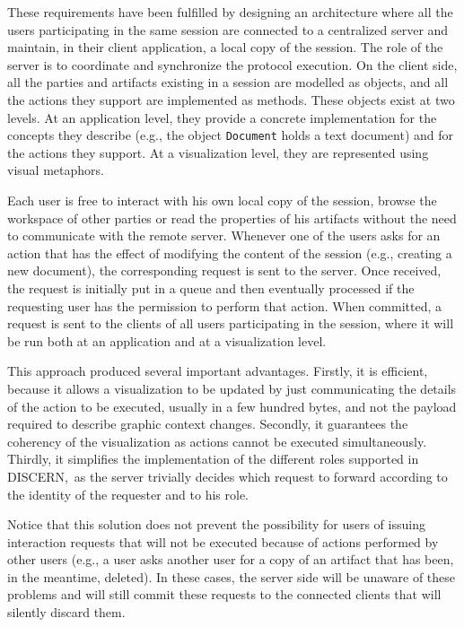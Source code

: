 \documentclass[10pt,conference]{IEEEtran}
\def\disgrace{DISCERN}
\begin{document}
These requirements have been fulfilled by designing an architecture
where all the users participating in the same session are connected to
a centralized server and maintain, in their client application, a
local copy of the session. The role of the server is to coordinate and
synchronize the protocol execution. On the client side, all the
parties and artifacts existing in a session are modelled as objects,
and all the actions they support are implemented as methods. These
objects exist at two levels. At an application level, they provide a
concrete implementation for the concepts they describe (e.g., the
object {\tt Document} holds a text document) and for the actions they
support. At a visualization level, they are represented using visual
metaphors.

Each user is free to interact with his own local copy of the session,
browse the workspace of other parties or read the properties of his
artifacts without the need to communicate with the remote
server. Whenever one of the users asks for an action that has the
effect of modifying the content of the session (e.g., creating a new
document), the corresponding request is sent to the server. Once
received, the request is initially put in a queue and then eventually
processed if the requesting user has the permission to perform that
action. When committed, a request is sent to the clients of all users
participating in the session, where it will be run both at an
application and at a visualization level.

This approach produced several important advantages. Firstly, it is
efficient, because it allows a visualization to be updated by just
communicating the details of the action to be executed, usually in a
few hundred bytes, and not the payload required to describe graphic
context changes. Secondly, it guarantees the coherency of the
visualization as actions cannot be executed simultaneously. Thirdly,
it simplifies the implementation of the different roles supported in
\disgrace,\ as the server trivially decides which request to forward
according to the identity of the requester and to his role.

Notice that this solution does not prevent the possibility for users
of issuing interaction requests that will not be executed because of
actions performed by other users (e.g., a user asks another user for a
copy of an artifact that has been, in the meantime, deleted). In these
cases, the server side will be unaware of these problems and will
still commit these requests to the connected clients that will
silently discard them.
\end{document}
